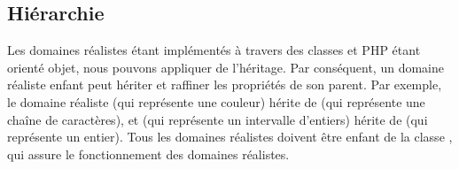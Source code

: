 \subsection{Hiérarchie}
\label{subsection:language:realdom:hierarchy}

Les domaines réalistes étant implémentés à travers des classes et PHP étant
orienté objet, nous pouvons appliquer de l'{\strong héritage}. Par conséquent,
un domaine réaliste enfant peut hériter et {\strong raffiner} les propriétés de
son parent. Par exemple, le domaine réaliste  (qui représente une
couleur) hérite de  (qui représente une chaîne de caractères), et
 (qui représente un intervalle d'entiers) hérite de
 (qui représente un entier). Tous les domaines réalistes doivent
être enfant de la classe , qui assure le fonctionnement des
domaines réalistes.

